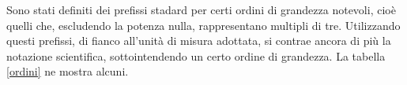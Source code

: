 \noindent Sono stati definiti dei prefissi stadard per certi ordini di grandezza notevoli,
cioè quelli che, escludendo la potenza nulla, rappresentano multipli di tre.
Utilizzando questi prefissi, di fianco all'unità di misura adottata, si contrae
ancora di più la notazione scientifica, sottointendendo un certo ordine di
grandezza. La tabella \ref{ordini} ne mostra alcuni.



